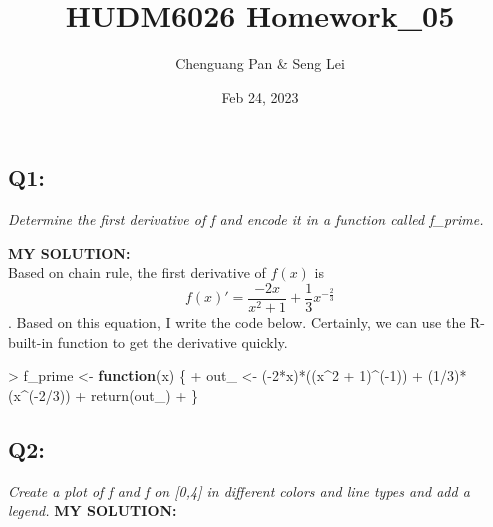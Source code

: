 \documentclass[
]{article}
\title{HUDM6026 Homework\_05}
\author{Chenguang Pan \& Seng Lei}
\date{Feb 24, 2023}
\newenvironment{Shaded}{\begin{snugshade}}{\end{snugshade}}
\newcommand{\ControlFlowTok}[1]{\textcolor[rgb]{0.13,0.29,0.53}{\textbf{#1}}}
\newcommand{\DecValTok}[1]{\textcolor[rgb]{0.00,0.00,0.81}{#1}}
\newcommand{\FunctionTok}[1]{\textcolor[rgb]{0.00,0.00,0.00}{#1}}
\newcommand{\NormalTok}[1]{#1}
\newcommand{\OtherTok}[1]{\textcolor[rgb]{0.56,0.35,0.01}{#1}}
\newcommand{\SpecialCharTok}[1]{\textcolor[rgb]{0.00,0.00,0.00}{#1}}
\begin{document}
\maketitle

\hypertarget{q1}{%
\subsection{Q1:}\label{q1}}

\emph{Determine the first derivative of f and encode it in a function
called f\_prime.}

\textbf{MY SOLUTION:}\\
Based on chain rule, the first derivative of \(f(x)\) is
\[f(x)' = \frac{-2x}{x^2+1}+\frac{1}{3}x^{-\frac{2}{3}}\]. Based on this
equation, I write the code below. Certainly, we can use the R-built-in
function to get the derivative quickly.

\begin{Shaded}
\begin{Highlighting}[]
\SpecialCharTok{\textgreater{}}\NormalTok{ f\_prime }\OtherTok{\textless{}{-}} \ControlFlowTok{function}\NormalTok{(x) \{}
\SpecialCharTok{+}\NormalTok{   out\_ }\OtherTok{\textless{}{-}}\NormalTok{ (}\SpecialCharTok{{-}}\DecValTok{2}\SpecialCharTok{*}\NormalTok{x)}\SpecialCharTok{*}\NormalTok{((x}\SpecialCharTok{\^{}}\DecValTok{2} \SpecialCharTok{+} \DecValTok{1}\NormalTok{)}\SpecialCharTok{\^{}}\NormalTok{(}\SpecialCharTok{{-}}\DecValTok{1}\NormalTok{)) }\SpecialCharTok{+}\NormalTok{ (}\DecValTok{1}\SpecialCharTok{/}\DecValTok{3}\NormalTok{)}\SpecialCharTok{*}\NormalTok{(x}\SpecialCharTok{\^{}}\NormalTok{(}\SpecialCharTok{{-}}\DecValTok{2}\SpecialCharTok{/}\DecValTok{3}\NormalTok{))}
\SpecialCharTok{+}   \FunctionTok{return}\NormalTok{(out\_)}
\SpecialCharTok{+}\NormalTok{ \}}
\end{Highlighting}
\end{Shaded}

\hypertarget{q2}{%
\subsection{Q2:}\label{q2}}

\emph{Create a plot of f and f on {[}0,4{]} in different colors and line
types and add a legend.} \textbf{MY SOLUTION:}
\end{document}
